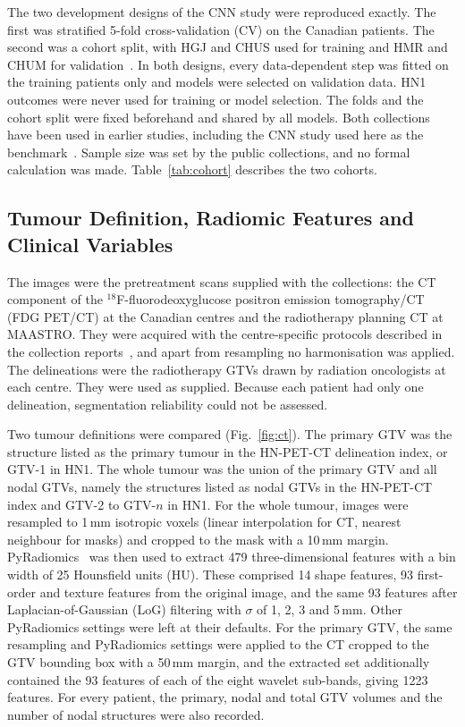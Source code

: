 \documentclass[pdflatex,iicol,sn-nature]{sn-jnl}
\begin{document}
The two development designs of the CNN study were reproduced exactly. The first was stratified 5-fold cross-validation (CV) on the Canadian patients. The second was a cohort split, with HGJ and CHUS used for training and HMR and CHUM for validation~\cite{diamant2019,mateus2023}. In both designs, every data-dependent step was fitted on the training patients only and models were selected on validation data. HN1 outcomes were never used for training or model selection. The folds and the cohort split were fixed beforehand and shared by all models. Both collections have been used in earlier studies, including the CNN study used here as the benchmark~\cite{vallieres2017,diamant2019,mateus2023,kazmierski2023}. Sample size was set by the public collections, and no formal calculation was made. Table~\ref{tab:cohort} describes the two cohorts.



\subsection{Tumour Definition, Radiomic Features and Clinical Variables}\label{sec:features}
The images were the pretreatment scans supplied with the collections: the CT component of the $^{18}$F-fluorodeoxyglucose positron emission tomography/CT (FDG PET/CT) at the Canadian centres and the radiotherapy planning CT at MAASTRO. They were acquired with the centre-specific protocols described in the collection reports~\cite{vallieres2017,aerts2014}, and apart from resampling no harmonisation was applied. The delineations were the radiotherapy GTVs drawn by radiation oncologists at each centre. They were used as supplied. Because each patient had only one delineation, segmentation reliability could not be assessed.

Two tumour definitions were compared (Fig.~\ref{fig:ct}). The primary GTV was the structure listed as the primary tumour in the HN-PET-CT delineation index, or GTV-1 in HN1. The whole tumour was the union of the primary GTV and all nodal GTVs, namely the structures listed as nodal GTVs in the HN-PET-CT index and GTV-2 to GTV-$n$ in HN1. For the whole tumour, images were resampled to 1\,mm isotropic voxels (linear interpolation for CT, nearest neighbour for masks) and cropped to the mask with a 10\,mm margin. PyRadiomics~\cite{vangriethuysen2017} was then used to extract 479 three-dimensional features with a bin width of 25 Hounsfield units (HU). These comprised 14 shape features, 93 first-order and texture features from the original image, and the same 93 features after Laplacian-of-Gaussian (LoG) filtering with $\sigma$ of 1, 2, 3 and 5\,mm. Other PyRadiomics settings were left at their defaults. For the primary GTV, the same resampling and PyRadiomics settings were applied to the CT cropped to the GTV bounding box with a 50\,mm margin, and the extracted set additionally contained the 93 features of each of the eight wavelet sub-bands, giving 1223 features. For every patient, the primary, nodal and total GTV volumes and the number of nodal structures were also recorded.
\end{document}
